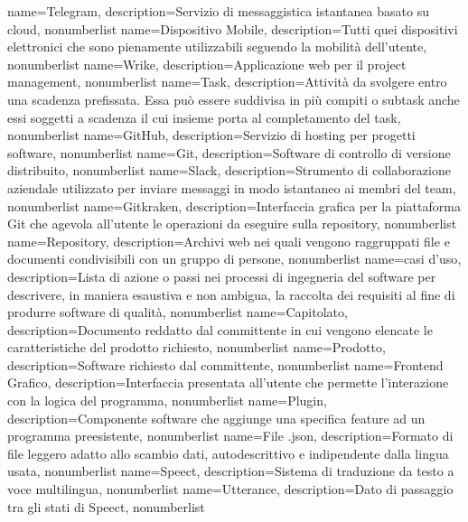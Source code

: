 {
	name={Telegram},
	description={Servizio di messaggistica istantanea basato su cloud},
	nonumberlist 
}
{
	name={Dispositivo Mobile},
	description={Tutti quei dispositivi elettronici che sono pienamente utilizzabili seguendo la mobilità dell'utente},
	nonumberlist 
}
{
	name={Wrike},
	description={Applicazione web per il project management},
	nonumberlist 
}
{
	name={Task},
	description={Attività da svolgere entro una scadenza prefissata. Essa può essere suddivisa in più compiti o subtask anche essi soggetti a scadenza il cui insieme porta al completamento del task},
	nonumberlist 
}
{
	name={GitHub},
	description={Servizio di hosting per progetti software},
	nonumberlist 
}
{
	name={Git},
	description={Software di controllo di versione distribuito},
	nonumberlist
}
{
	name={Slack},
	description={Strumento di collaborazione aziendale utilizzato per inviare messaggi in modo istantaneo ai membri del team},
	nonumberlist
}
{
	name={Gitkraken},
	description={Interfaccia grafica per la piattaforma Git che agevola all'utente le operazioni da eseguire sulla repository},
	nonumberlist
}
{
	name={Repository},
	description={Archivi web nei quali vengono raggruppati file e documenti condivisibili con un gruppo di persone},
	nonumberlist
}
{
	name={casi d'uso},
	description={Lista di azione o passi nei processi di ingegneria del software per descrivere, in maniera esaustiva e non ambigua, la raccolta dei requisiti al fine di produrre software di qualità},
	nonumberlist
}
{
	name={Capitolato},
	description={Documento reddatto dal committente in cui vengono elencate le caratteristiche del prodotto richiesto},
	nonumberlist
}
{
	name={Prodotto},
	description={Software richiesto dal committente},
	nonumberlist
}
{
	name={Frontend Grafico},
	description={Interfaccia presentata all'utente che permette l'interazione con la logica del programma},
	nonumberlist
}
{
	name={Plugin},
	description={Componente software che aggiunge una specifica feature ad un programma preesistente},
	nonumberlist
}
{
	name={File .json},
	description={Formato di file leggero adatto allo scambio dati, autodescrittivo e indipendente dalla lingua usata},
	nonumberlist
}
{
	name={Speect},
	description={Sistema di traduzione da testo a voce multilingua},
	nonumberlist
}
{
	name={Utterance},
	description={Dato di passaggio tra gli stati di Speect},
	nonumberlist
}


